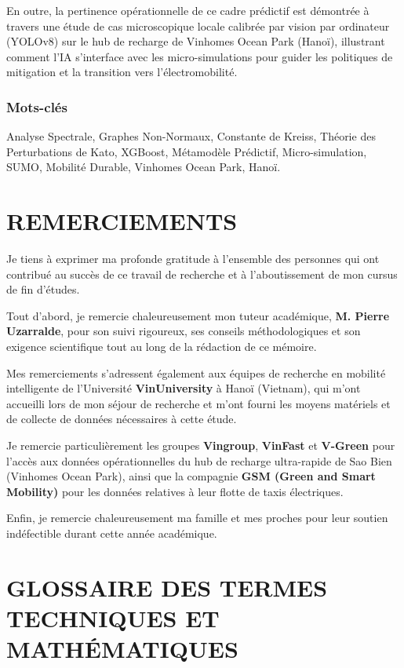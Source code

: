 \documentclass[10pt, a4paper]{article}
\begin{document}
En outre, la pertinence opérationnelle de ce cadre prédictif est
démontrée à travers une étude de cas microscopique locale calibrée par
vision par ordinateur (YOLOv8) sur le hub de recharge de Vinhomes Ocean
Park (Hanoï), illustrant comment l'IA s'interface avec les
micro-simulations pour guider les politiques de mitigation et la
transition vers l'électromobilité.

\subsubsection{Mots-clés}\label{mots-cluxe9s}

Analyse Spectrale, Graphes Non-Normaux, Constante de Kreiss, Théorie des
Perturbations de Kato, XGBoost, Métamodèle Prédictif, Micro-simulation,
SUMO, Mobilité Durable, Vinhomes Ocean Park, Hanoï.

\newpage

\section{REMERCIEMENTS}\label{remerciements}

Je tiens à exprimer ma profonde gratitude à l'ensemble des personnes qui
ont contribué au succès de ce travail de recherche et à l'aboutissement
de mon cursus de fin d'études.

Tout d'abord, je remercie chaleureusement mon tuteur académique,
\textbf{M. Pierre Uzarralde}, pour son suivi rigoureux, ses conseils
méthodologiques et son exigence scientifique tout au long de la
rédaction de ce mémoire.

Mes remerciements s'adressent également aux équipes de recherche en
mobilité intelligente de l'Université \textbf{VinUniversity} à Hanoï
(Vietnam), qui m'ont accueilli lors de mon séjour de recherche et m'ont
fourni les moyens matériels et de collecte de données nécessaires à
cette étude.

Je remercie particulièrement les groupes \textbf{Vingroup},
\textbf{VinFast} et \textbf{V-Green} pour l'accès aux données
opérationnelles du hub de recharge ultra-rapide de Sao Bien (Vinhomes
Ocean Park), ainsi que la compagnie \textbf{GSM (Green and Smart
Mobility)} pour les données relatives à leur flotte de taxis
électriques.

Enfin, je remercie chaleureusement ma famille et mes proches pour leur
soutien indéfectible durant cette année académique.

\newpage

\section{GLOSSAIRE DES TERMES TECHNIQUES ET
MATHÉMATIQUES}\label{glossaire-des-termes-techniques-et-mathuxe9matiques}
\end{document}
